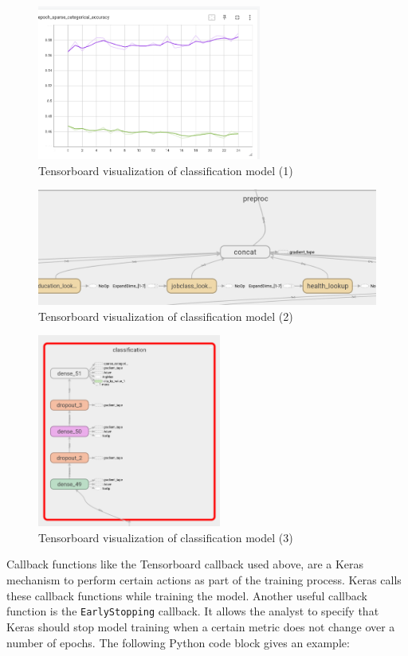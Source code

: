 \begin{figure}
\begin{center}
\includegraphics[height=2in]{screen11.png}
\end{center}
\caption{Tensorboard visualization of classification model (1)}
\label{fig:screen11_chap15}
\end{figure}

\begin{figure}
\centering
\includegraphics[width=.9\textwidth]{screen10.png} 
\caption{Tensorboard visualization of classification model (2)}
\label{fig:screen10_chap15}
\end{figure}

\begin{figure}
\centering
\includegraphics[height=2.5in]{screen9.png}
\caption{Tensorboard visualization of classification model (3)}
\label{fig:screen9_chap15}
\end{figure}

Callback functions like the Tensorboard callback used above, are a Keras mechanism to perform certain actions as part of the training process. Keras calls these callback functions while training the model. Another useful callback function is the \texttt{EarlyStopping} callback. It allows the analyst to specify that Keras should stop model training when a certain metric does not change over a number of epochs. The following Python code block gives an example:

